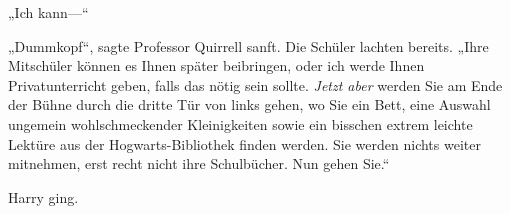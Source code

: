 „Ich kann—“

„Dummkopf“, sagte Professor Quirrell sanft. Die Schüler lachten bereits. „Ihre Mitschüler können es Ihnen später beibringen, oder ich werde Ihnen Privatunterricht geben, falls das nötig sein sollte. \emph{Jetzt aber} werden Sie am Ende der Bühne durch die dritte Tür von links gehen, wo Sie ein Bett, eine Auswahl ungemein wohlschmeckender Kleinigkeiten sowie ein bisschen extrem leichte Lektüre aus der Hogwarts-Bibliothek finden werden. Sie werden nichts weiter mitnehmen, erst recht nicht ihre Schulbücher. Nun gehen Sie.“

Harry ging.

